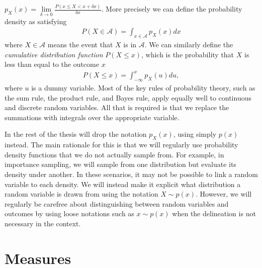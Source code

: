 $p_{X}(x) = \lim\limits_{\delta\rightarrow0} \frac{P(x\le X <x+\delta x)}{\delta x}$.  More 
precisely we can define the probability density as satisfying
\begin{align}
\label{eq:prob:density}
P(X\in \mathcal{A}) = \int_{x\in\mathcal{A}} p_{X}(x) dx
\end{align}
where $X\in \mathcal{A}$ means the event that $X$ is in $\mathcal{A}$.  We can similarly
define the \emph{cumulative distribution function} $P(X\le x)$, which is the probability
that $X$ is less than equal to the outcome $x$
\begin{align}
\label{eq:prob:cumulative}
P(X\le x) = \int_{-\infty}^{x} p_{X}(u) du,
\end{align}
where $u$ is a dummy variable.
Most of the key rules of probability theory, such as the sum rule, the product rule, and Bayes
rule, apply equally well to continuous and discrete random variables.  All that is required
is that we replace the summations with integrals over the appropriate variable. 

In the rest of the thesis will drop the notation $p_{X}(x)$, using simply $p(x)$ instead.
The main rationale for this is that we will regularly use probability density functions that we do
not actually sample from.  For example, in importance sampling, we will sample from one
distribution but evaluate its density under another.  In these scenarios, it may not be possible
to link a random variable to each density.  We will instead make it explicit what distribution
a random variable is drawn from using the notation $X\sim p(x)$.  
However, we will regularly be carefree about
distinguishing between random variables and outcomes by using loose notations such as
$x\sim p(x)$ when the delineation is not necessary in the context.


\section{Measures}
\label{sec:prob:measure}

